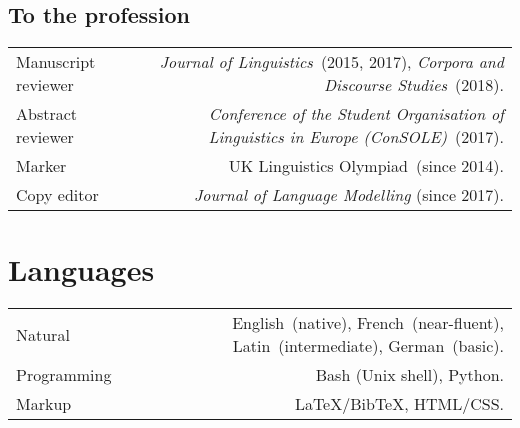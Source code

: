 \documentclass[11pt,a4paper,twoside]{article}
\makeatletter
\newenvironment{cvsection}{%
  \setlength{\extrarowheight}{0.70ex}
  \begin{longtable}[l]{@{} L R @{}}
}{%
  \end{longtable}
}
\newcommand{\Label}[1]{%
\textnormal{#1}%
}
\makeatother
\begin{document}
\subsection*{To the profession}

%
%

\begin{cvsection}
\Label{Manuscript reviewer} &	\textit{Journal of Linguistics}~(2015, 2017),
                      \textit{Corpora and Discourse Studies}~(2018).\\
\Label{Abstract reviewer}   & \textit{Conference of the Student Organisation of
                      Linguistics in Europe (ConSOLE)}~(2017).\\
\Label{Marker}              & UK Linguistics Olympiad~(since 2014).\\
\Label{Copy editor}         & \textit{Journal of Language Modelling} (since 2017).
\end{cvsection}

\newpage
\section*{Languages}

\begin{cvsection}
  \Label{Natural}      & English~(native), French~(near-fluent),
                          Latin~(intermediate), German~(basic). \\
  \Label{Programming}  & Bash (Unix shell), Python. \\
  \Label{Markup}       & \LaTeX*\slash Bib\TeX*, HTML\slash CSS.
\end{cvsection}

\end{document}
